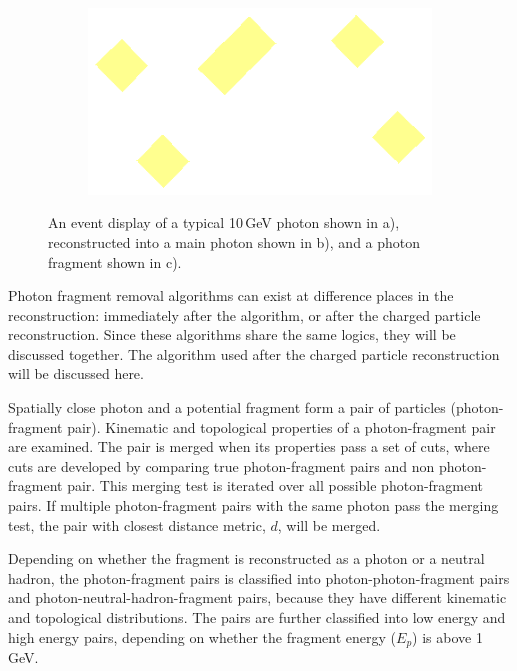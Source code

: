\begin{figure}[tbph]
  \begin{subfigure}[b]{0.3\textwidth}
    \includegraphics[width=\textwidth]{photon/small}
    \caption{}
    \label{fig:photonEvtDspPhotonFragSmall}
  \end{subfigure}

\caption
{An event display of a typical 10\,GeV photon shown in a), reconstructed into a main photon shown in b), and a photon fragment shown in c). }
\label{fig:photonEvtDspPhotonFrag}
\end{figure}


Photon fragment removal algorithms can exist at difference places in the reconstruction: immediately after the \PhotonReconstruction algorithm, or after the charged particle reconstruction. Since these algorithms share the same logics, they will be discussed together. The algorithm used   after the charged particle reconstruction will be discussed here.

Spatially close photon and a potential fragment form a pair of particles (photon-fragment pair). Kinematic and topological properties of a photon-fragment pair are examined. The pair is merged when its properties pass a set of cuts, where cuts are developed by comparing true photon-fragment pairs and non photon-fragment pair. This merging test is iterated over all possible  photon-fragment pairs. If multiple photon-fragment pairs with the same photon pass the merging test, the pair with closest distance metric, $d$, will be merged.

Depending on whether the fragment is reconstructed as a photon or a neutral hadron, the photon-fragment pairs is classified into photon-photon-fragment pairs and photon-neutral-hadron-fragment pairs, because they have different kinematic and topological distributions. The pairs are further classified into low energy and high energy pairs, depending on whether the fragment energy ($E_p$) is above 1\,GeV.


